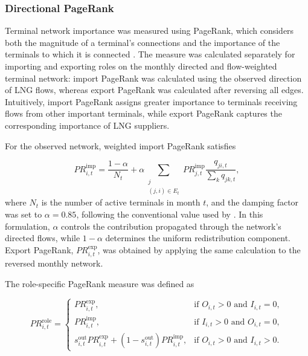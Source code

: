 \documentclass[pdftex,12pt,openright,a4paper,oneside]{book}
\begin{document}
\subsubsection{Directional PageRank}
\label{subsubsec:directional_pagerank}
Terminal network importance was measured using PageRank, which considers both the magnitude of a terminal's connections and the importance of the terminals to which it is connected \citep{page1999pagerank}. 
The measure was calculated separately for importing and exporting roles on the monthly directed and flow-weighted terminal network: import PageRank was calculated using the observed direction of LNG flows, whereas export PageRank was calculated after reversing all edges. 
Intuitively, import PageRank assigns greater importance to terminals receiving flows from other important terminals, while export PageRank captures the corresponding importance of LNG suppliers.

For the observed network, weighted import PageRank satisfies

\begin{equation}
PR^{\mathrm{imp}}_{i,t}
=
\frac{1-\alpha}{N_t}
+
\alpha
\sum_{\substack{j \\ (j,i)\in E_t}}
PR^{\mathrm{imp}}_{j,t}
\frac{q_{ji,t}}
{\sum_k q_{jk,t}},
\label{eq:import_pagerank}
\end{equation}
where \(N_t\) is the number of active terminals in month \(t\), and the damping factor was set to \(\alpha=0.85\), following the
conventional value used by \citet{brin1998anatomy}. In this formulation, \(\alpha\) controls the contribution propagated through the
network's directed flows, while \(1-\alpha\) determines the uniform redistribution component. 
Export PageRank, \(PR^{\mathrm{exp}}_{i,t}\), was obtained by applying the same calculation to the reversed monthly network.

The role-specific PageRank measure was defined as

\begin{equation}
PR^{\mathrm{role}}_{i,t}
=
\begin{cases}
PR^{\mathrm{exp}}_{i,t},
& \text{if } O_{i,t}>0 \text{ and } I_{i,t}=0, \\[4pt]
PR^{\mathrm{imp}}_{i,t},
& \text{if } I_{i,t}>0 \text{ and } O_{i,t}=0, \\[4pt]
s^{\mathrm{out}}_{i,t}PR^{\mathrm{exp}}_{i,t}
+
\left(1-s^{\mathrm{out}}_{i,t}\right)
PR^{\mathrm{imp}}_{i,t},
& \text{if } O_{i,t}>0 \text{ and } I_{i,t}>0.
\end{cases}
\label{eq:role_pagerank}
\end{equation}
\end{document}
